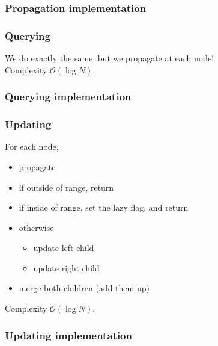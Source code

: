 \documentclass[12pt]{beamer}
\newcommand{\bigoh}{\mathcal{O}}
\begin{document}
\begin{frame}
    \frametitle{Propagation implementation}
    
\end{frame}

\begin{frame}
    \frametitle{Querying}
    We do exactly the same, but we propagate at each node! \\
    Complexity $\bigoh(\log N)$.

\end{frame}

\begin{frame}
    \frametitle{Querying implementation}
    
\end{frame}

\begin{frame}
    \frametitle{Updating}
    For each node, 
    \begin{itemize}
        \item propagate
        \item if outside of range, return
        \item if inside of range, set the lazy flag, and return
        \item otherwise
            \begin{itemize}
                \item update left child
                \item update right child
            \end{itemize}
        \item merge both children (add them up)
    \end{itemize}
    Complexity $\bigoh(\log N)$.
\end{frame}

\begin{frame}
    \frametitle{Updating implementation}
    
\end{frame}
\end{document}
